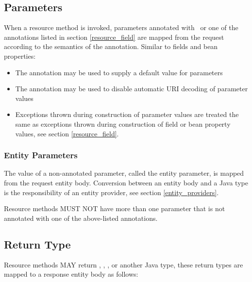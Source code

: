 \subsection{Parameters}
\label{resource_method_params}

When a resource method is invoked, parameters annotated with \FormParam\ or one of the  annotations listed in section \ref{resource_field} are mapped from the request according to the semantics of the annotation. Similar to fields and bean properties:
\begin{itemize}
\item The  annotation may be used to supply a default value for parameters
\item The  annotation may be used to disable automatic URI decoding of parameter values
\item Exceptions thrown during construction of parameter values are treated the same as exceptions thrown during construction of field or bean property values, see section \ref{resource_field}.
\end{itemize}

\subsubsection{Entity Parameters}

The value of a non-annotated parameter, called the entity parameter, is mapped from the request entity body. Conversion between an entity body and a Java type is the responsibility of an entity provider, see section \ref{entity_providers}.

Resource methods MUST NOT have more than one parameter that is not annotated with one of the above-listed annotations.

\subsection{Return Type}
\label{resource_method_return}

Resource methods MAY return , \Response, , or another Java type, these return types are mapped to a response entity body as follows:

